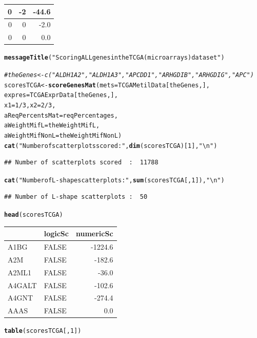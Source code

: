 \documentclass[a4paper,10pt]{article}\usepackage[]{graphicx}\usepackage[]{xcolor}
\makeatletter
\newcommand{\hlnum}[1]{\textcolor[rgb]{0.686,0.059,0.569}{#1}}%
\newcommand{\hlstr}[1]{\textcolor[rgb]{0.192,0.494,0.8}{#1}}%
\newcommand{\hlcom}[1]{\textcolor[rgb]{0.678,0.584,0.686}{\textit{#1}}}%
\newcommand{\hlopt}[1]{\textcolor[rgb]{0,0,0}{#1}}%
\newcommand{\hlstd}[1]{\textcolor[rgb]{0.345,0.345,0.345}{#1}}%
\newcommand{\hlkwb}[1]{\textcolor[rgb]{0.69,0.353,0.396}{#1}}%
\newcommand{\hlkwc}[1]{\textcolor[rgb]{0.333,0.667,0.333}{#1}}%
\newcommand{\hlkwd}[1]{\textcolor[rgb]{0.737,0.353,0.396}{\textbf{#1}}}%
\newenvironment{kframe}{%
 \def\at@end@of@kframe{}%
 \ifinner\ifhmode%
  \def\at@end@of@kframe{\end{minipage}}%
  \begin{minipage}{\columnwidth}%
 \fi\fi%
 \def\FrameCommand##1{\hskip\@totalleftmargin \hskip-\fboxsep
 \colorbox{shadecolor}{##1}\hskip-\fboxsep
     \hskip-\linewidth \hskip-\@totalleftmargin \hskip\columnwidth}%
 \MakeFramed {\advance\hsize-\width
   \@totalleftmargin\z@ \linewidth\hsize
   \@setminipage}}%
 {\par\unskip\endMakeFramed%
 \at@end@of@kframe}
\newenvironment{knitrout}{}{} %
\makeatother
\begin{document}
\begin{knitrout}
\begin{tabular}{r|r|r}
\hline
0 & -2 & -44.6\\
\hline
0 & 0 & -2.0\\
\hline
0 & 0 & 0.0\\
\hline
\end{tabular}\begin{kframe}\begin{alltt}
 \hlkwd{messageTitle}\hlstd{(}\hlstr{"Scoring ALL genes in the TCGA (microarrays) dataset"}\hlstd{)}

\hlcom{# theGenes <- c("ALDH1A2", "ALDH1A3", "APCDD1", "ARHGDIB", "ARHGDIG", "APC")}
\hlstd{scoresTCGA} \hlkwb{<-} \hlkwd{scoreGenesMat} \hlstd{(}\hlkwc{mets}\hlstd{=TCGAMetilData[theGenes,],}
                                                                      \hlkwc{expres}\hlstd{=TCGAExprData[theGenes,],}
                                                                       \hlkwc{x1}\hlstd{=}\hlnum{1}\hlopt{/}\hlnum{3}\hlstd{,} \hlkwc{x2}\hlstd{=}\hlnum{2}\hlopt{/}\hlnum{3}\hlstd{,}
                            \hlkwc{aReqPercentsMat}\hlstd{=reqPercentages,}
                            \hlkwc{aWeightMifL}\hlstd{=theWeightMifL,}
                            \hlkwc{aWeightMifNonL}\hlstd{=theWeightMifNonL )}
\hlkwd{cat}\hlstd{(}\hlstr{"Number of scatterplots scored  : "}\hlstd{,} \hlkwd{dim}\hlstd{(scoresTCGA)[}\hlnum{1}\hlstd{],}\hlstr{"\textbackslash{}n"}\hlstd{)}
\end{alltt}
\begin{verbatim}
## Number of scatterplots scored  :  11788
\end{verbatim}
\begin{alltt}
\hlkwd{cat}\hlstd{(}\hlstr{"Number of L-shape scatterplots : "}\hlstd{,} \hlkwd{sum}\hlstd{(scoresTCGA[,}\hlnum{1}\hlstd{]),}\hlstr{"\textbackslash{}n"}\hlstd{)}
\end{alltt}
\begin{verbatim}
## Number of L-shape scatterplots :  50
\end{verbatim}
\begin{alltt}
\hlkwd{head}\hlstd{(scoresTCGA)}
\end{alltt}
\end{kframe}


\begin{tabular}{l|l|r}
\hline
  & logicSc & numericSc\\
\hline
A1BG & FALSE & -1224.6\\
\hline
A2M & FALSE & -182.6\\
\hline
A2ML1 & FALSE & -36.0\\
\hline
A4GALT & FALSE & -102.6\\
\hline
A4GNT & FALSE & -274.4\\
\hline
AAAS & FALSE & 0.0\\
\hline
\end{tabular}\begin{kframe}\begin{alltt}
\hlkwd{table}\hlstd{(scoresTCGA[,}\hlnum{1}\hlstd{])}
\end{alltt}
\end{kframe}



\end{knitrout}
\end{document}
